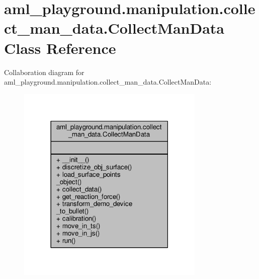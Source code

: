 \hypertarget{classaml__playground_1_1manipulation_1_1collect__man__data_1_1_collect_man_data}{\section{aml\-\_\-playground.\-manipulation.\-collect\-\_\-man\-\_\-data.\-Collect\-Man\-Data Class Reference}
\label{classaml__playground_1_1manipulation_1_1collect__man__data_1_1_collect_man_data}
}


Collaboration diagram for aml\-\_\-playground.\-manipulation.\-collect\-\_\-man\-\_\-data.\-Collect\-Man\-Data\-:
\nopagebreak
\begin{figure}[H]
\begin{center}
\leavevmode
\includegraphics[width=254pt]{classaml__playground_1_1manipulation_1_1collect__man__data_1_1_collect_man_data__coll__graph}
\end{center}
\end{figure}
